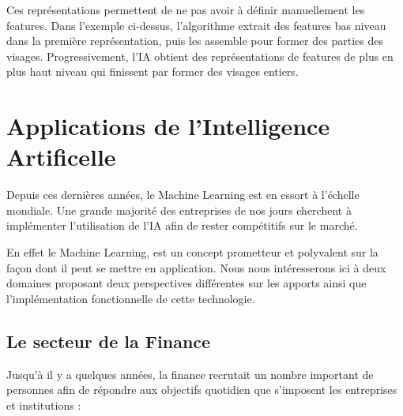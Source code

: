 Ces représentations permettent de ne pas avoir à définir manuellement les features.
Dans l'exemple ci-dessus, l'algorithme extrait des features bas niveau dans la
première représentation, puis les assemble pour former des parties des
visages. Progressivement, l'IA obtient des représentations de features de plus en plus
haut niveau qui finissent par former des visages entiers. \newline

\chapter{Applications de l'Intelligence Artificelle}
Depuis ces dernières années, le Machine Learning est en essort à l'échelle mondiale.
Une grande majorité des entreprises de nos jours cherchent à implémenter l'utilisation de l'IA
afin de rester compétitifs sur le marché. \newline

En effet le Machine Learning, est un concept prometteur
et polyvalent sur la façon dont il peut se mettre en application.
Nous nous intéresserons ici à deux domaines proposant deux perspectives différentes
sur les apports ainsi que l'implémentation fonctionnelle de cette technologie.

\section{Le secteur de la Finance}
Jusqu'à il y a quelques années, la finance recrutait un nombre
important de personnes afin de répondre aux objectifs quotidien
que s'imposent les entreprises et institutions :\newline

